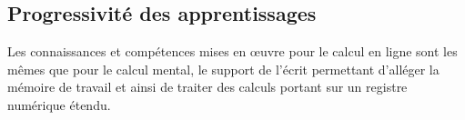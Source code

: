\bigskip


\subsection{Progressivité des apprentissages} 

Les connaissances et compétences mises en œuvre pour le calcul en ligne sont les mêmes que pour le calcul mental, le support de l’écrit permettant d’alléger la mémoire de travail et ainsi de traiter des calculs portant sur un registre numérique étendu.

%
%
%
%
%
%
%
%
